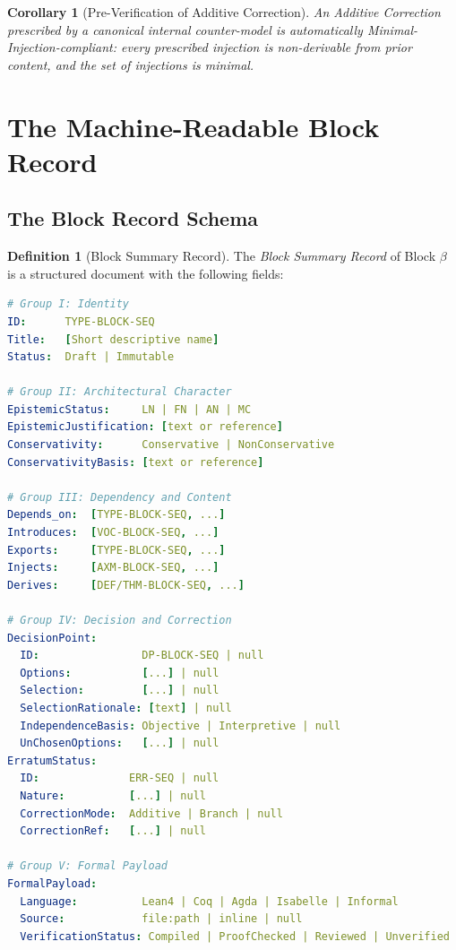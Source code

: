 \documentclass[12pt, a4paper]{article}
\theoremstyle{plain}
\newtheorem{corollary}[theorem]{Corollary}
\theoremstyle{definition}
\newtheorem{definition}[theorem]{Definition}
\theoremstyle{remark}
\begin{document}
\begin{corollary}[Pre-Verification of Additive Correction]
\label{cor:cm-preverify}
An Additive Correction prescribed by a canonical internal
counter-model is automatically Minimal-Injection-compliant: every
prescribed injection is non-derivable from prior content, and the
set of injections is minimal.
\end{corollary}

\section{The Machine-Readable Block Record}
\label{sec:record}

\subsection{The Block Record Schema}
\label{subsec:schema}

\begin{definition}[Block Summary Record]
\label{def:record}
The \emph{Block Summary Record} of Block $\beta$ is a structured
document with the following fields:

\begin{lstlisting}[language=yaml, caption={Block Summary Record Schema}]
# Group I: Identity
ID:      TYPE-BLOCK-SEQ
Title:   [Short descriptive name]
Status:  Draft | Immutable

# Group II: Architectural Character
EpistemicStatus:     LN | FN | AN | MC
EpistemicJustification: [text or reference]
Conservativity:      Conservative | NonConservative
ConservativityBasis: [text or reference]

# Group III: Dependency and Content
Depends_on:  [TYPE-BLOCK-SEQ, ...]
Introduces:  [VOC-BLOCK-SEQ, ...]
Exports:     [TYPE-BLOCK-SEQ, ...]
Injects:     [AXM-BLOCK-SEQ, ...]
Derives:     [DEF/THM-BLOCK-SEQ, ...]

# Group IV: Decision and Correction
DecisionPoint:
  ID:                DP-BLOCK-SEQ | null
  Options:           [...] | null
  Selection:         [...] | null
  SelectionRationale: [text] | null
  IndependenceBasis: Objective | Interpretive | null
  UnChosenOptions:   [...] | null
ErratumStatus:
  ID:              ERR-SEQ | null
  Nature:          [...] | null
  CorrectionMode:  Additive | Branch | null
  CorrectionRef:   [...] | null

# Group V: Formal Payload
FormalPayload:
  Language:          Lean4 | Coq | Agda | Isabelle | Informal
  Source:            file:path | inline | null
  VerificationStatus: Compiled | ProofChecked | Reviewed | Unverified
\end{lstlisting}
\end{definition}
\end{document}

